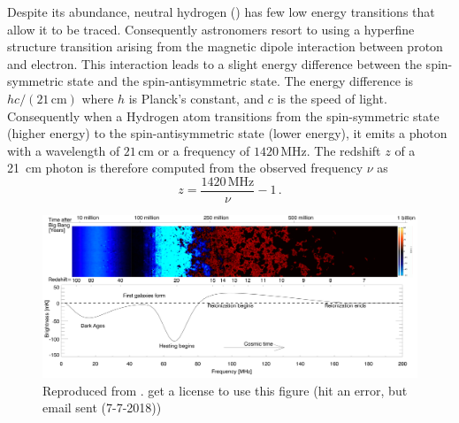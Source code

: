 \begin{bibunit}
Despite its abundance, neutral hydrogen () has few low energy transitions that allow it to
be traced.  Consequently astronomers resort to using a hyperfine structure transition arising from
the magnetic dipole interaction between proton and electron. This interaction leads to a slight
energy difference between the spin-symmetric state and the spin-antisymmetric state. The energy
difference is $hc / (21\,\text{cm})$ where $h$ is Planck's constant, and $c$ is the speed of light.
Consequently when a Hydrogen atom transitions from the spin-symmetric state (higher energy) to the
spin-antisymmetric state (lower energy), it emits a photon with a wavelength of $21\,\text{cm}$ or a
frequency of $1420\,\text{MHz}$. The redshift $z$ of a 21~cm photon is therefore computed from the
observed frequency $\nu$ as
\begin{equation}
    z = \frac{1420\,\text{MHz}}{\nu} - 1\,.
\end{equation}

\begin{figure}[t]
    \centering
    \includegraphics[width=\textwidth]{figures/chapter1/pritchard-2012-global-signal}
    \caption{
        Reproduced from \citet{2012RPPh...75h6901P}.
        get a license to use this figure (hit an error, but email sent (7-7-2018))
    }
    \label{fig:pritchard-global-signal}
\end{figure}


\end{bibunit}
